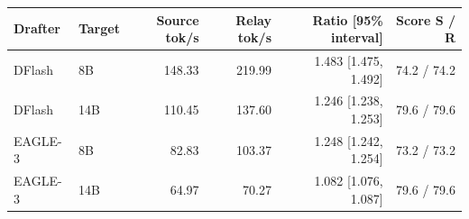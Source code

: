 \begin{tabular}{llrrrr}
\toprule
Drafter & Target & Source tok/s & Relay tok/s & Ratio [95\% interval] & Score S / R \\
\midrule
DFlash & 8B & 148.33 & 219.99 & 1.483 [1.475, 1.492] & 74.2 / 74.2 \\
DFlash & 14B & 110.45 & 137.60 & 1.246 [1.238, 1.253] & 79.6 / 79.6 \\
EAGLE-3 & 8B & 82.83 & 103.37 & 1.248 [1.242, 1.254] & 73.2 / 73.2 \\
EAGLE-3 & 14B & 64.97 & 70.27 & 1.082 [1.076, 1.087] & 79.6 / 79.6 \\
\bottomrule
\end{tabular}

